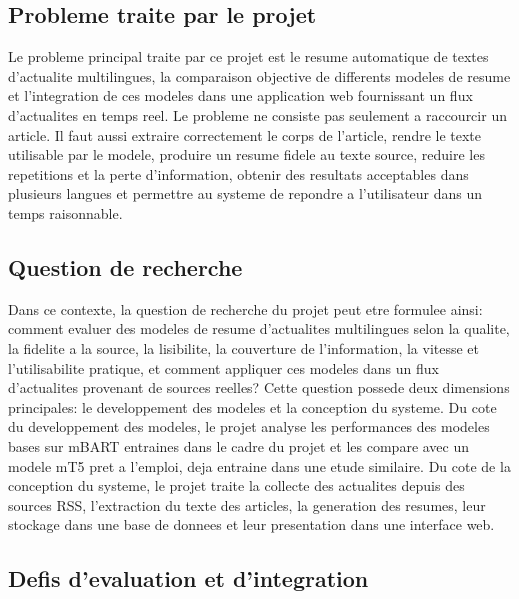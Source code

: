 \subsection{Probleme traite par le projet}

Le probleme principal traite par ce projet est le resume automatique de textes d'actualite multilingues, la comparaison objective de differents modeles de resume et l'integration de ces modeles dans une application web fournissant un flux d'actualites en temps reel. Le probleme ne consiste pas seulement a raccourcir un article. Il faut aussi extraire correctement le corps de l'article, rendre le texte utilisable par le modele, produire un resume fidele au texte source, reduire les repetitions et la perte d'information, obtenir des resultats acceptables dans plusieurs langues et permettre au systeme de repondre a l'utilisateur dans un temps raisonnable.

\subsection{Question de recherche}

Dans ce contexte, la question de recherche du projet peut etre formulee ainsi: comment evaluer des modeles de resume d'actualites multilingues selon la qualite, la fidelite a la source, la lisibilite, la couverture de l'information, la vitesse et l'utilisabilite pratique, et comment appliquer ces modeles dans un flux d'actualites provenant de sources reelles? Cette question possede deux dimensions principales: le developpement des modeles et la conception du systeme. Du cote du developpement des modeles, le projet analyse les performances des modeles bases sur mBART entraines dans le cadre du projet et les compare avec un modele mT5 pret a l'emploi, deja entraine dans une etude similaire. Du cote de la conception du systeme, le projet traite la collecte des actualites depuis des sources RSS, l'extraction du texte des articles, la generation des resumes, leur stockage dans une base de donnees et leur presentation dans une interface web.

\subsection{Defis d'evaluation et d'integration}

